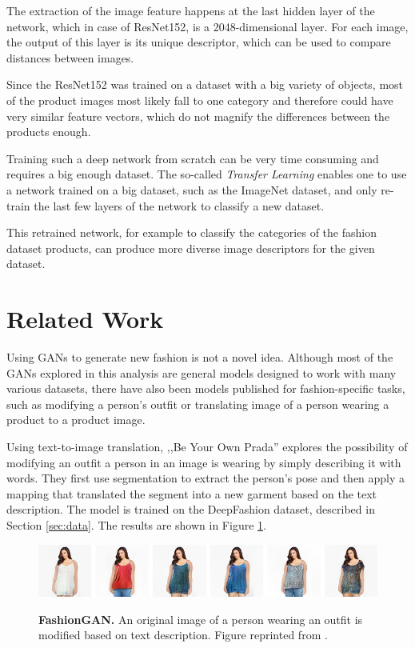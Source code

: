 \documentclass[12pt]{report}
\begin{document}
The extraction of the image feature happens at the last hidden layer of the network, which in case of ResNet152, is a 2048-dimensional layer. For each image, the output of this layer is its unique descriptor, which can be used to compare distances between images.

Since the ResNet152 was trained on a dataset with a big variety of objects, most of the product images most likely fall to one category and therefore could have very similar feature vectors, which do not magnify the differences between the products enough.

Training such a deep network from scratch can be very time consuming and requires a big enough dataset. The so-called \textit{Transfer Learning} enables one to use a network trained on a big dataset, such as the ImageNet dataset, and only re-train the last few layers of the network to classify a new dataset.

This retrained network, for example to classify the categories of the fashion dataset products, can produce more diverse image descriptors for the given dataset.

\pagebreak
\section{Related Work}
Using GANs to generate new fashion is not a novel idea. Although most of the GANs explored in this analysis are general models designed to work with many various datasets, there have also been models published for fashion-specific tasks, such as modifying a person's outfit or translating image of a person wearing a product to a product image.

Using text-to-image translation, ,,Be Your Own Prada'' \cite{zhu_be_2017} explores the possibility of modifying an outfit a person in an image is wearing by simply describing it with words. They first use segmentation to extract the person's pose and then apply a mapping that translated the segment into a new garment based on the text description. The model is trained on the DeepFashion dataset, described in Section \ref{sec:data}. The results are shown in Figure \ref{fig:fashiongan}.

\begin{figure}[h]
\centering
{\includegraphics[width=\linewidth]{03_analysis/related/fashiongan}}
\caption{\label{fig:fashiongan} \textbf{FashionGAN.} An original image of a person wearing an outfit is modified based on text description. Figure reprinted from \cite{zhu_be_2017}.}
\end{figure}
\end{document}
